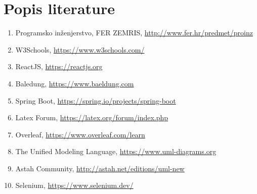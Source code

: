 \chapter*{Popis literature}
	 	
		
		
		\begin{enumerate}
			
			
			\item  Programsko inženjerstvo, FER ZEMRIS, \url{http://www.fer.hr/predmet/proinz}
			
			\item W3Schools, \url{https://www.w3schools.com/}
			
			\item ReactJS, \url{https://reactjs.org}
			
			\item Baledung, \url{https://www.baeldung.com}
			
			\item  Spring Boot, \url{https://spring.io/projects/spring-boot}
			
			\item  Latex Forum, \url{https://latex.org/forum/index.php}
			
			\item  Overleaf, \url{https://www.overleaf.com/learn}
			
			\item  The Unified Modeling Language, \url{https://www.uml-diagrams.org}
			
			\item  Astah Community, \url{http://astah.net/editions/uml-new}
			
			\item  Selenium, \url{https://www.selenium.dev/}
		\end{enumerate}
		
		 